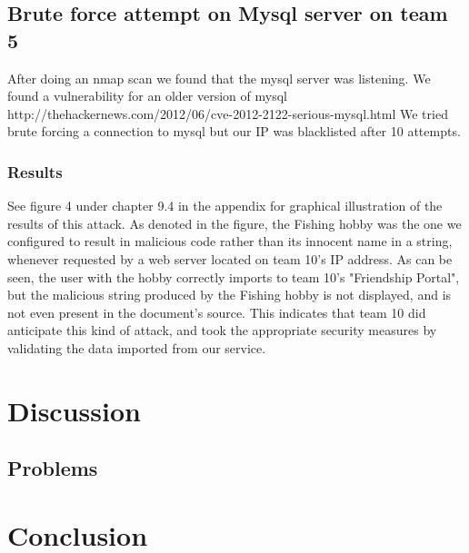 \documentclass[a4paper]{article}
\begin{document}
\subsection{Brute force attempt on Mysql server on team 5}
After doing an nmap scan we found that the mysql server was listening.
We found a vulnerability for an older version of mysql http://thehackernews.com/2012/06/cve-2012-2122-serious-mysql.html
We tried brute forcing a connection to mysql but our IP was blacklisted after 10 attempts.

\subsubsection{Results}
See figure 4 under chapter 9.4 in the appendix for graphical illustration of the results of this attack. As denoted in the figure, the Fishing hobby was the one we configured to result in malicious code rather than its innocent name in a string, whenever requested by a web server located on team 10's IP address. As can be seen, the user with the hobby correctly imports to team 10's "Friendship Portal", but the malicious string produced by the Fishing hobby is not displayed, and is not even present in the document's source. This indicates that team 10 did anticipate this kind of attack, and took the appropriate security measures by validating the data imported from our service.



\section{Discussion}


\subsection{Problems}


\section{Conclusion}
\end{document}
